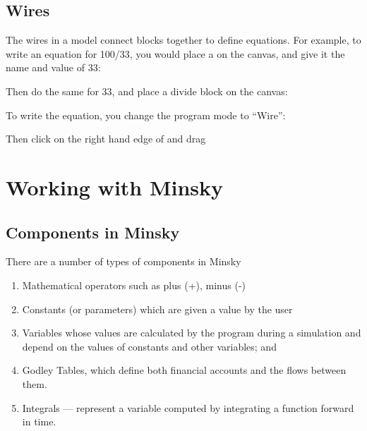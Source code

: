 
\subsection{Wires}
\label{Wires}

The wires in a model connect blocks together to define equations. For
example, to write an equation for 100/33, you would place a
 on the canvas, and give it the name and value of 33:

\begin{center}
\end{center}

Then do the same for 33, and place a divide block on the canvas:

\begin{center}
\end{center}

To write the equation, you change the program mode to ``Wire'':



Then click on the right hand edge of 
and drag 

\section{Working with Minsky}

\subsection{Components in Minsky}

There are a number of types of components in Minsky
\begin{enumerate}
\item Mathematical operators such as plus (+), minus (-)
\item Constants (or parameters) which are given a value by the user
\item Variables whose values are calculated by the program during a simulation and depend on the values of constants and other variables; and
\item Godley Tables, which define both financial accounts and the
flows between them.
\item Integrals --- represent a variable computed by integrating a
function forward in time.
\end{enumerate}



